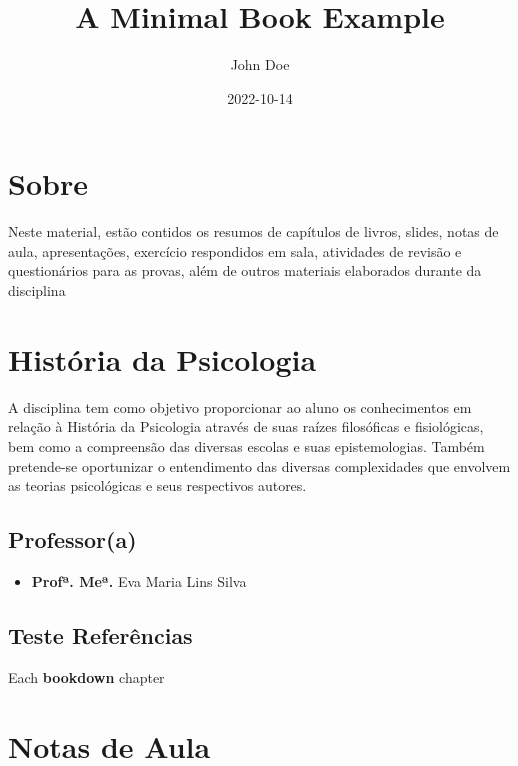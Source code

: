 \documentclass[
]{book}
\title{A Minimal Book Example}
\author{John Doe}
\date{2022-10-14}
\providecommand{\tightlist}{%
  \setlength{\itemsep}{0pt}\setlength{\parskip}{0pt}}
\theoremstyle{definition}
\theoremstyle{definition}
\theoremstyle{definition}
\theoremstyle{definition}
\theoremstyle{remark}
\begin{document}
\maketitle

{
\setcounter{tocdepth}{1}
\tableofcontents
}
\hypertarget{sobre}{%
\chapter{Sobre}\label{sobre}}

Neste material, estão contidos os resumos de capítulos de livros, slides, notas de aula, apresentações, exercício respondidos em sala, atividades de revisão e questionários para as provas, além de outros materiais elaborados durante da disciplina

\hypertarget{histuxf3ria-da-psicologia}{%
\chapter{História da Psicologia}\label{histuxf3ria-da-psicologia}}

A disciplina tem como objetivo proporcionar ao aluno os conhecimentos em relação à História da Psicologia através de suas raízes filosóficas e fisiológicas, bem como a compreensão das diversas escolas e suas epistemologias. Também pretende-se oportunizar o entendimento das diversas complexidades que envolvem as teorias psicológicas e seus respectivos autores.

\hypertarget{professora}{%
\section*{Professor(a)}\label{professora}}

\begin{itemize}
\tightlist
\item
  \textbf{Profª. Meª.} Eva Maria Lins Silva
\end{itemize}

\hypertarget{teste-referuxeancias}{%
\section{Teste Referências}\label{teste-referuxeancias}}

Each \textbf{bookdown} chapter \citep{Book}

\hypertarget{notas-de-aula}{%
\chapter{Notas de Aula}\label{notas-de-aula}}
\end{document}
